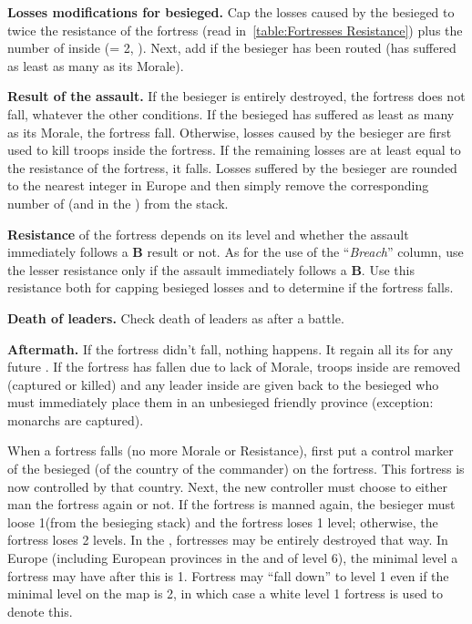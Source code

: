 
\textbf{Losses modifications for besieged.} Cap the losses caused by the
besieged to twice the resistance of the fortress (read
in~\ref{table:Fortresses Resistance}) plus the number of \LD inside
(\ARMY\facemoins = 2\LD, \ARMY{}\LD). Next, add \texttd if the
besieger has been routed (has suffered as least as many \textetoile as its
Morale).

\textbf{Result of the assault.} If the besieger is entirely destroyed, the
fortress does not fall, whatever the other conditions. If the besieged has
suffered as least as many \textetoile as its Morale, the fortress
fall. Otherwise, losses caused by the besieger are first used to kill troops
inside the fortress. If the remaining losses are at least equal to the
resistance of the fortress, it falls. Losses suffered by the besieger are
rounded to the nearest integer in Europe and then simply remove the
corresponding number of \LD (and \LDE in the \ROTW) from the stack.

\textbf{Resistance} of the fortress depends on its level and whether the
assault immediately follows a \textbf{B} result or not. As for the use of the
``\emph{Breach}'' column, use the lesser resistance only if the assault
immediately follows a \textbf{B}. Use this resistance both for capping
besieged losses and to determine if the fortress falls.

\textbf{Death of leaders.} Check death of leaders as after a battle.

\textbf{Aftermath.} If the fortress didn't fall, nothing happens. It regain
all its  for any future . If the fortress has
fallen due to lack of Morale, troops inside are removed (captured or killed)
and any leader inside are given back to the besieged who must immediately
place them in an unbesieged friendly province (exception: monarchs are
captured).

When a fortress falls (no more Morale or Resistance), first put a control
marker of the besieged (of the country of the commander) on the fortress. This
fortress is now controlled by that country. Next, the new controller must
choose to either man the fortress again or not. If the fortress is manned
again, the besieger must loose 1\LD (from the besieging stack) and the
fortress loses 1 level; otherwise, the fortress loses 2 levels. In the \ROTW,
fortresses may be entirely destroyed that way. In Europe (including European
provinces in the \ROTW and \COL of level 6), the minimal level a fortress may
have after this is 1. Fortress may ``fall down'' to level 1 even if the
minimal level on the map is 2, in which case a white level 1 fortress is used
to denote this.

